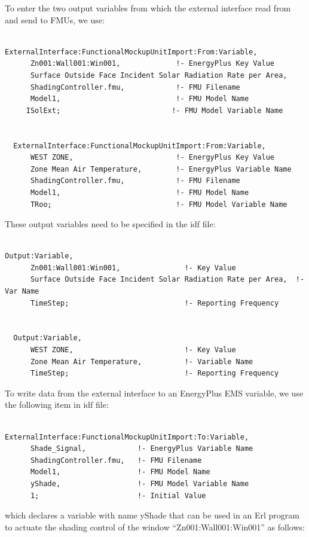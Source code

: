 To enter the two output variables from which the external interface read from and send to FMUs, we use:

\begin{lstlisting}

ExternalInterface:FunctionalMockupUnitImport:From:Variable,
      Zn001:Wall001:Win001,             !- EnergyPlus Key Value
      Surface Outside Face Incident Solar Radiation Rate per Area,
      ShadingController.fmu,            !- FMU Filename
      Model1,                           !- FMU Model Name
     ISolExt;                          !- FMU Model Variable Name


  ExternalInterface:FunctionalMockupUnitImport:From:Variable,
      WEST ZONE,                        !- EnergyPlus Key Value
      Zone Mean Air Temperature,        !- EnergyPlus Variable Name
      ShadingController.fmu,            !- FMU Filename
      Model1,                           !- FMU Model Name
      TRoo;                             !- FMU Model Variable Name
\end{lstlisting}

These output variables need to be specified in the idf file:

\begin{lstlisting}

Output:Variable,
      Zn001:Wall001:Win001,               !- Key Value
      Surface Outside Face Incident Solar Radiation Rate per Area,  !- Var Name
      TimeStep;                           !- Reporting Frequency


  Output:Variable,
      WEST ZONE,                          !- Key Value
      Zone Mean Air Temperature,          !- Variable Name
      TimeStep;                           !- Reporting Frequency
\end{lstlisting}

To write data from the external interface to an EnergyPlus EMS variable, we use the following item in idf file:

\begin{lstlisting}

ExternalInterface:FunctionalMockupUnitImport:To:Variable,
      Shade_Signal,            !- EnergyPlus Variable Name
      ShadingController.fmu,   !- FMU Filename
      Model1,                  !- FMU Model Name
      yShade,                  !- FMU Model Variable Name
      1;                       !- Initial Value
\end{lstlisting}

which declares a variable with name yShade that can be used in an Erl program to actuate the shading control of the window ``Zn001:Wall001:Win001'' as follows:

